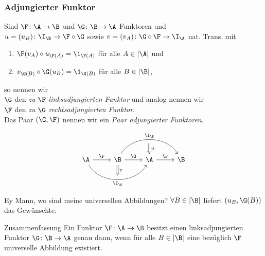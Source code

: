 \begin{frame}[fragile]
  \frametitle{Adjungierter Funktor}

\pause
  \begin{defn*}
  Sind $\F \colon \A \to \B$ und $\G \colon \B \to \A$ Funktoren und \\
    $u = (u_B) \colon \I_\B \to \F \circ \G$ sowie $v = (v_A) \colon \G \circ \F \to \I_\A$ nat. Trans. mit 
  \begin{enumerate}[(1)]
    \item $\F(v_A) \circ u_{\F(A)} = \1_{\F(A)}$ für alle $A \in |\A|$ und
    \item $v_{\G(B)} \circ \G(u_B) = \1_{\G(B)}$ für alle $B \in |\B|$,
  \end{enumerate}
  so nennen wir\\
    $\G$ den \emph{zu $\F$ linksadjungierten Funktor} und analog nennen wir \\
    $\F$ den \emph{zu $\G$ rechtsadjungierten Funktor}.\\
  Das Paar $(\G, \F)$ nennen wir ein \emph{Paar adjungierter Funktoren}.
\end{defn*}

    \pause
    $$
    \begin{tikzcd}[column sep=2.5em,row sep=1.5em]
      & & \ \arrow[d,"u",Rightarrow] & \\  
      \A \arrow[r,"\F"]\arrow[rr,"\I_\A"',bend right=60 ] & \B \arrow[r,"\G"] \arrow[rr,"\I_\B", bend left=60] \arrow[d,"v",Rightarrow] & \A \arrow[r,"\F"] & \B \\
      & \  &  &
    \end{tikzcd}
    $$
\end{frame}

\begin{frame}

  \begin{block}{Ey Mann, wo sind meine universellen Abbildungen?}
    \pause
    $\forall B \in |\B|$ liefert $(u_B, \G(B))$ das Gew\"unschte.
  \end{block}

\pause

  \begin{block}{Zusammenfassung}
    Ein Funktor $\F \colon \A \to \B$ besitzt einen linksadjungierten Funktor $\G \colon \B \to \A$ genau dann, wenn für alle $B \in |\B|$ eine bezüglich $\F$ universelle Abbildung existiert.
  \end{block}

\end{frame}


